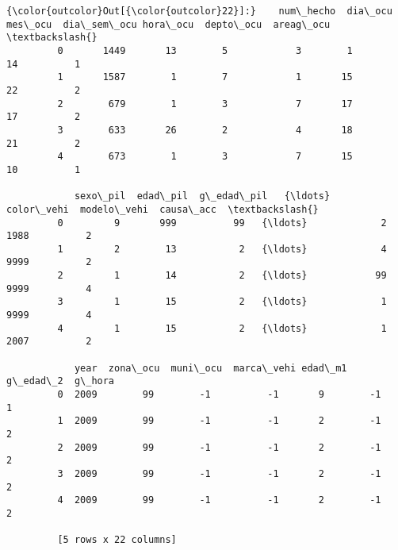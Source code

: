 \documentclass[11pt]{article}
\begin{document}
\begin{Verbatim}[commandchars=\\\{\}]
{\color{outcolor}Out[{\color{outcolor}22}]:}    num\_hecho  dia\_ocu  mes\_ocu  dia\_sem\_ocu hora\_ocu  depto\_ocu  areag\_ocu  \textbackslash{}
         0       1449       13        5            3        1         14          1   
         1       1587        1        7            1       15         22          2   
         2        679        1        3            7       17         17          2   
         3        633       26        2            4       18         21          2   
         4        673        1        3            7       15         10          1   
         
            sexo\_pil  edad\_pil  g\_edad\_pil   {\ldots}    color\_vehi  modelo\_vehi  causa\_acc  \textbackslash{}
         0         9       999          99   {\ldots}             2         1988          2   
         1         2        13           2   {\ldots}             4         9999          2   
         2         1        14           2   {\ldots}            99         9999          4   
         3         1        15           2   {\ldots}             1         9999          4   
         4         1        15           2   {\ldots}             1         2007          2   
         
            year  zona\_ocu  muni\_ocu  marca\_vehi edad\_m1  g\_edad\_2  g\_hora  
         0  2009        99        -1          -1       9        -1       1  
         1  2009        99        -1          -1       2        -1       2  
         2  2009        99        -1          -1       2        -1       2  
         3  2009        99        -1          -1       2        -1       2  
         4  2009        99        -1          -1       2        -1       2  
         
         [5 rows x 22 columns]
\end{Verbatim}
            
\end{document}
